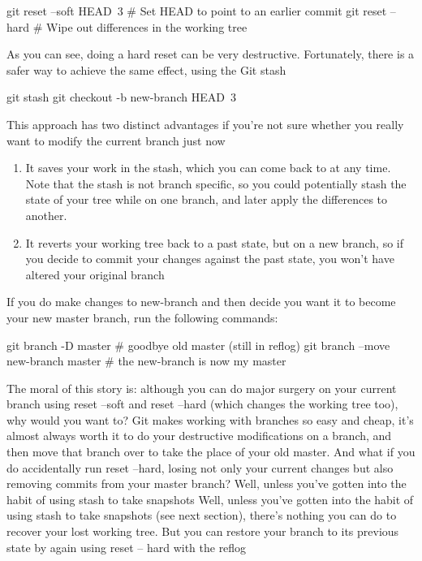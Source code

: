 \documentclass{report}
\begin{document}
\begin{itemize}
\begin{bashcode}
                git reset --soft HEAD~3 # Set HEAD to point to an earlier commit
                git reset --hard # Wipe out differences in the working tree
            \end{bashcode}
            \bigbreak \noindent 
            As you can see, doing a hard reset can be very destructive. Fortunately, there is a safer way to achieve the same effect, using the Git stash
            \bigbreak \noindent 
            \begin{bashcode}
                git stash
                git checkout -b new-branch HEAD~3
            \end{bashcode}
            \bigbreak \noindent 
            This approach has two distinct advantages if you’re not sure whether you really want to modify the current branch just now
            \begin{enumerate}
                \item It saves your work in the stash, which you can come back to at any time. Note that the stash is not branch specific, so you could potentially stash the state of your tree while on one branch, and later apply the differences to another.
                \item It reverts your working tree back to a past state, but on a new branch, so if you decide to commit your changes against the past state, you won’t have altered your original branch
            \end{enumerate}
            If you do make changes to new-branch and then decide you want it to become your new master branch, run the following commands:
            \bigbreak \noindent 
            \begin{bashcode}
                git branch -D master # goodbye old master (still in reflog)
                git branch --move new-branch master # the new-branch is now my master
            \end{bashcode}
            \bigbreak \noindent 
            The moral of this story is: although you can do major surgery on your current branch using reset --soft and reset --hard (which changes the working tree too), why would you want to? Git makes working with branches so easy and cheap, it’s almost always worth it to do your destructive modifications on a branch, and then move that branch over to take the place of your old master. 
            \bigbreak \noindent 
            And what if you do accidentally run reset --hard, losing not only your current changes but also removing commits from your master branch? Well, unless you’ve gotten into the habit of using stash to take snapshots Well, unless you’ve gotten into the habit of using stash to take snapshots (see next section), there’s nothing you can do to recover your lost working tree. But you can restore your branch to its previous state by again using reset -- hard with the reflog

\end{itemize}
\end{document}
